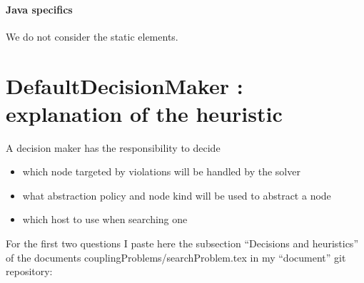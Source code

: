 \documentclass[]{article}
\begin{document}
\paragraph{Java specifics}
We do not consider the static elements.


\section{DefaultDecisionMaker : explanation of the heuristic}
\label{section:defaultDecisionMaker}

A decision maker has the responsibility to decide
\begin{itemize}
\item which node targeted by violations will be handled by the solver
\item what abstraction policy and node kind will be used to abstract a node
\item which host to use when searching one
\end{itemize}

For the first two questions I paste here the subsection ``Decisions and heuristics'' of the documents couplingProblems/searchProblem.tex in my ``document'' git repository:
\end{document}
